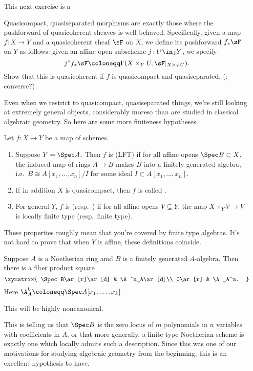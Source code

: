 This next exercise is a 
\begin{ex}
Quasicompact, quasiseparated morphisms are exactly those where the pushforward of quasicoherent sheaves is
well-behaved. Specifically, given a map $f\colon X\to Y$ and a quasicoherent sheaf $\sF$ on $X$, we define its
pushforward $f_*\sF$ on $Y$ as follows: given an affine open subscheme $j\colon U \inj Y$, we specify
\[j^*f_*\sF \coloneqq\Gamma(X\times_Y U, \sF|_{X\times_Y U}).\]
Show that this is quasicoherent if $f$ is quasicompact and quasiseparated. (\TODO: converse?)
\end{ex}
Even when we restrict to quasicompact, quasiseparated things, we're still looking at extremely general objects,
considerably moreso than are studied in classical algebraic geometry. So here are some more finiteness hypotheses.
\begin{defn}
Let $f\colon X\to Y$ be a map of schemes.
\begin{enumerate}
	\item Suppose $Y = \Spec A$. Then $f$ is  (LFT) if for all affine opens $\Spec
	B\subset X$, the induced map of rings $A\to B$ makes $B$ into a finitely generated algebra, i.e.\ $B\cong
	A[x_1,\dotsc,x_n]/I$ for some ideal $I\subset A[x_1,\dotsc,x_n]$.
	\item If in addition $X$ is quasicompact, then $f$ is called .
	\item For general $Y$, $f$ is  (resp.\ ) if for all affine opens
	$V\subseteq Y$, the map $X\times_Y V\to V$ is locally finite type (resp.\ finite type).
\end{enumerate}
\end{defn}
These properties roughly mean that you're covered by finite type algebras. It's not hard to prove that when $Y$ is
affine, these definitions coincide.
\begin{thm}
\label{hilbbasis}
Suppose $A$ is a Noetherian ring amd $B$ is a finitely generated $A$-algebra. Then there is a fiber product square
\[\xymatrix{
	\Spec B\ar[r]\ar[d] & \A^n_A\ar[d]\\
	0\ar[r] & \A_A^m.
}\]
Here $\A_A^k\coloneqq\Spec A[x_1,\dotsc,x_k]$.
\end{thm}
This will be highly noncanonical.
\begin{rem}
This is telling us that $\Spec B$ is the zero locus of $m$ polynomials in $n$ variables with coefficients in $A$,
or that more generally, a finite type Noetherian scheme is exactly one which locally admits such a description.
Since this was one of our motivations for studying algebraic geometry from the beginning, this is an excellent
hypothesis to have.
\end{rem}
